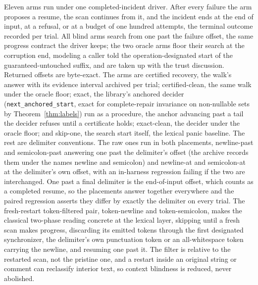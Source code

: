 \documentclass[11pt,a4paper]{article}
\theoremstyle{definition}
\theoremstyle{plain}
\theoremstyle{remark}
\newcommand{\code}[1]{\texttt{#1}}
\begin{document}
Eleven arms run under one completed-incident driver. After every failure the arm proposes a resume, the scan continues
from it, and the incident ends at the end of input, at a refusal, or at a budget of one hundred attempts, the terminal
outcome recorded per trial. All blind arms search from one past the failure offset, the same progress contract the
driver keeps; the two oracle arms floor their search at the corruption end, modeling a caller told the
operation-designated start of the guaranteed-untouched suffix, and are taken up with the trust discussion. Returned
offsets are byte-exact. The arms are certified recovery, the walk's answer with its evidence interval archived per
trial; certified-clean, the same walk under the oracle floor; exact, the library's anchored decider
(\code{next\_anchored\_start}, exact for complete-repair invariance on non-nullable sets by Theorem~\ref{thm:labels})
run as a procedure, the anchor advancing past a tail the decider refuses until a certificate holds; exact-clean, the
decider under the oracle floor; and skip-one, the search start itself, the lexical panic baseline. The rest are
delimiter conventions. The raw ones run in both placements, newline-past and semicolon-past answering one past the
delimiter's offset (the archive records them under the names newline and semicolon) and newline-at and semicolon-at at
the delimiter's own offset, with an in-harness regression failing if the two are interchanged. One past a final
delimiter is the end-of-input offset, which counts as a completed resume, so the placements answer together everywhere
and the paired regression asserts they differ by exactly the delimiter on every trial. The fresh-restart token-filtered
pair, token-newline and token-semicolon, makes the classical two-phase reading concrete at the lexical layer, skipping
until a fresh scan makes progress, discarding its emitted tokens through the first designated synchronizer, the
delimiter's own punctuation token or an all-whitespace token carrying the newline, and resuming one past it. The filter
is relative to the restarted scan, not the pristine one, and a restart inside an original string or comment can
reclassify interior text, so context blindness is reduced, never abolished.
\end{document}
